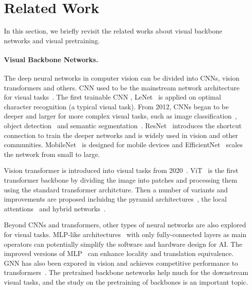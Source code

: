 \documentclass[10pt,twocolumn,letterpaper]{article}
\begin{document}
\section{Related Work}
In this section, we briefly revisit the related works about visual backbone networks and visual pretraining.

\paragraph{Visual Backbone Networks.}
The deep neural networks in computer vision can be divided into CNNs, vision transformers and others. CNN used to be the mainstream network architecture for visual tasks~\cite{lecun1998gradient,alexnet,resnet}. The first trainable CNN \ie, LeNet~\cite{lecun1998gradient} is applied on optimal character recognition (a typical visual task). From 2012, CNNs began to be deeper and larger for more complex visual tasks, such as image classification~\cite{alexnet}, object detection~\cite{fasterRCNN} and semantic segmentation~\cite{fcn}. ResNet~\cite{resnet} introduces the shortcut connection to train the deeper networks and is widely used in vision and other communities. MobileNet~\cite{mobilenet} is designed for mobile devices and EfficientNet~\cite{efficientnet} scales the network from small to large.

Vision transformer is introduced into visual tasks from 2020~\cite{vit-survey,vit,detr}. ViT~\cite{vit} is the first transformer backbone by dividing the image into patches and processing them using the standard transformer architcture. Then a number of variants and improvements are proposed incluidng the pyramid architectures~\cite{pvt,swin}, the local attentions~\cite{tnt,swin} and hybrid networks~\cite{guo2022cmt,metaformer}.

Beyond CNNs and transformers, other types of neural networks are also explored for visual tasks. MLP-like architectures~\cite{mixer,resmlp} with only fully-connected layers as main operators can potentially simplify the software and hardware design for AI. The improved versions of MLP~\cite{cyclemlp,asmlp,hire,wavemlp} can enhance locality and translation equivalence. GNN has also been expored in vision and achieves competitive performance to transformers~\cite{vig}. The pretrained backbone neteworks help much for the downstream visual tasks, and the study on the pretraining of backbones is an important topic.
\end{document}
